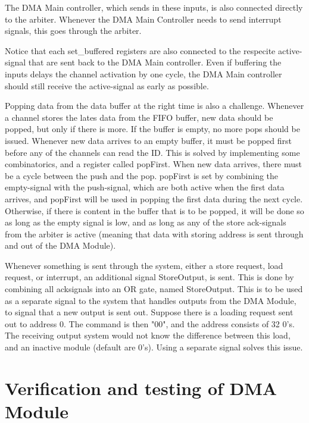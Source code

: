 \begin{appendix}
The DMA Main controller, which sends in these inputs, is also connected directly to the arbiter.
Whenever the DMA Main Controller needs to send interrupt signals, this goes through the arbiter.

Notice that each set\_buffered registers are also connected to the respecite active-signal that are sent back to the DMA Main controller.
Even if buffering the inputs delays the channel activation by one cycle, the DMA Main controller should still receive the active-signal as early as possible.

Popping data from the data buffer at the right time is also a challenge.
Whenever a channel stores the lates data from the FIFO buffer, new data should be popped, but only if there is more.
If the buffer is empty, no more pops should be issued.
Whenever new data arrives to an empty buffer, it must be popped first before any of the channels can read the ID.
This is solved by implementing some combinatorics, and a register called popFirst.
When new data arrives, there must be a cycle between the push and the pop.
popFirst is set by combining the empty-signal with the push-signal, which are both active when the first data arrives, and popFirst will be used in popping the first data during the next cycle.
Otherwise, if there is content in the buffer that is to be popped, it will be done so as long as the empty signal is low, and as long as any of the store ack-signals from the arbiter is active (meaning that data with storing address is sent through and out of the DMA Module).

Whenever something is sent through the system, either a store request, load request, or interrupt, an additional signal StoreOutput, is sent.
This is done by combining all ack\-signals into an OR gate, named StoreOutput.
This is to be used as a separate signal to the system that handles outputs from the DMA Module, to signal that a new output is sent out.
Suppose there is a loading request sent out to address 0.
The command is then "00", and the address consists of 32 0's.
The receiving output system would not know the difference between this load, and an inactive module (default are 0's).
Using a separate signal solves this issue.

\section{Verification and testing of DMA Module}


\end{appendix}
